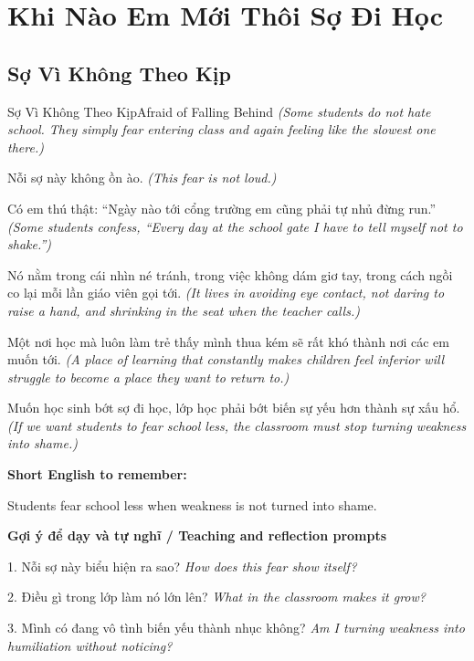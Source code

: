 \chapter{Khi Nào Em Mới Thôi Sợ Đi Học}

\section{Sợ Vì Không Theo Kịp}
\begin{truyen}{Sợ Vì Không Theo Kịp}{Afraid of Falling Behind}
\textit{(Some students do not hate school. They simply fear entering class and again feeling like the slowest one there.)}

Nỗi sợ này không ồn ào.
\textit{(This fear is not loud.)}

Có em thú thật: “Ngày nào tới cổng trường em cũng phải tự nhủ đừng run.”
\textit{(Some students confess, “Every day at the school gate I have to tell myself not to shake.”)}

Nó nằm trong cái nhìn né tránh, trong việc không dám giơ tay, trong cách ngồi co lại mỗi lần giáo viên gọi tới.
\textit{(It lives in avoiding eye contact, not daring to raise a hand, and shrinking in the seat when the teacher calls.)}

Một nơi học mà luôn làm trẻ thấy mình thua kém sẽ rất khó thành nơi các em muốn tới.
\textit{(A place of learning that constantly makes children feel inferior will struggle to become a place they want to return to.)}

\end{truyen}

\begin{baihoc}
Muốn học sinh bớt sợ đi học, lớp học phải bớt biến sự yếu hơn thành sự xấu hổ.
\textit{(If we want students to fear school less, the classroom must stop turning weakness into shame.)}
\end{baihoc}

\begin{ghinhoanh}
\textbf{Short English to remember:}

Students fear school less when weakness is not turned into shame.

\end{ghinhoanh}

\begin{tuhocnhanh}
\textbf{Gợi ý để dạy và tự nghĩ / Teaching and reflection prompts}

1. Nỗi sợ này biểu hiện ra sao? \textit{How does this fear show itself?}

2. Điều gì trong lớp làm nó lớn lên? \textit{What in the classroom makes it grow?}

3. Mình có đang vô tình biến yếu thành nhục không? \textit{Am I turning weakness into humiliation without noticing?}
\end{tuhocnhanh}
\ngancach

